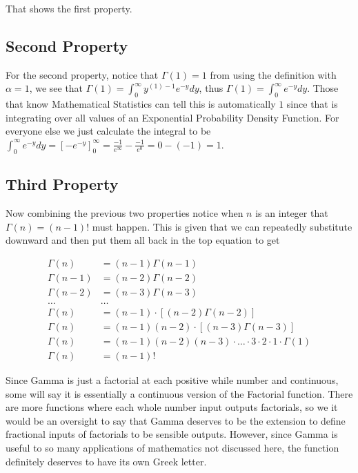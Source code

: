 \documentclass[12pt]{article}
\begin{document}
That shows the first property.

\subsection{Second Property}

For the second property, notice that $\Gamma(1)=1$ from using the definition with $\alpha=1$, we see that $\Gamma(1)=\int_{0}^{\infty}y^{(1)-1}e^{-y}dy$, thus $\Gamma(1)= \int_{0}^{\infty} e^{-y} dy$. Those that know Mathematical Statistics can tell this is automatically $1$ since that is integrating over all values of an Exponential Probability Density Function. For everyone else we just calculate the integral to be $\int_{0}^{\infty} e^{-y} dy= \left[ -e^{-y} \right]_{0}^{\infty}=\frac{-1}{e^{\infty}}-\frac{-1}{e^0}=0-(-1)=1$. 

\subsection{Third Property}

Now combining the previous two properties notice when $n$ is an integer that $\Gamma(n) = (n-1)!$ must happen. This is given that we can repeatedly substitute downward and then put them all back in the top equation to get

\begin{align*}
    \Gamma(n)&=(n-1)\Gamma(n-1) \\
    \Gamma(n-1)&=(n-2)\Gamma(n-2) \\
    \Gamma(n-2)&=(n-3)\Gamma(n-3) \\
    \ldots & \ldots \\
    \Gamma(n)&=(n-1)\cdot [(n-2)\Gamma(n-2)] \\
    \Gamma(n)&=(n-1)(n-2)\cdot [(n-3)\Gamma(n-3)] \\
    \Gamma(n)&=(n-1)(n-2)(n-3)\cdot\ldots\cdot3\cdot2\cdot1\cdot\Gamma(1) \\
    \Gamma(n)&=(n-1)!
\end{align*}

Since Gamma is just a factorial at each positive while number and continuous, some will say it is essentially a continuous version of the Factorial function. There are more functions where each whole number input outputs factorials, so we it would be an oversight to say that Gamma deserves to be the extension to define fractional inputs of factorials to be sensible outputs. However, since Gamma is useful to so many applications of mathematics not discussed here, the function definitely deserves to have its own Greek letter.
\end{document}
